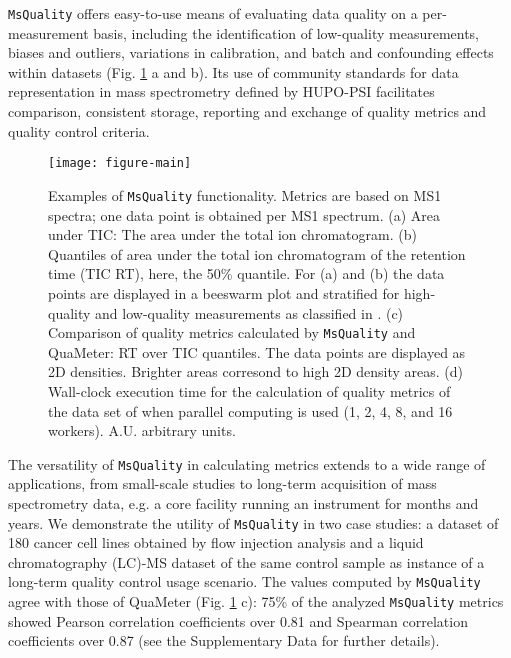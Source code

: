 \documentclass{bioinfo}
\begin{document}
\texttt{MsQuality} offers easy-to-use means of evaluating data quality on a
per-measurement basis, including the identification of low-quality measurements,
biases and outliers, variations in calibration, and batch and confounding effects within
datasets (Fig. \ref{fig:fig1} a and b). Its use of community standards for data
representation in mass spectrometry defined by HUPO-PSI facilitates comparison, 
consistent
storage, reporting and exchange of quality metrics and quality control criteria.

\begin{figure}
    \centering
 	\texttt{[image: figure-main]}
 	  \caption{Examples of \texttt{MsQuality} functionality. Metrics are based
 	        on MS1 spectra; one data point is obtained per MS1 spectrum.
 	        (a) Area under TIC: The area under the total ion chromatogram. 
            (b) Quantiles of area under the total ion
                chromatogram of the retention time (TIC RT), here, the 50\% quantile. 
  	      For (a) and (b) the data points are displayed 
                in a beeswarm plot and stratified for high-quality and low-quality
                measurements as classified in \cite{Amidan2014}.
            (c) Comparison of quality metrics calculated by \texttt{MsQuality} 
                and QuaMeter: RT over TIC quantiles. The
	      data points are displayed as 2D densities. Brighter areas corresond to
               high 2D density areas.
            (d) Wall-clock execution time for the calculation of quality metrics of the 
                data set of \cite{Amidan2014} when parallel computing is used 
                (1, 2, 4, 8, and 16 workers). A.U. arbitrary units.
    } \label{fig:fig1}
\end{figure}

The versatility of \texttt{MsQuality} in calculating metrics extends to a wide range of
applications, from small-scale studies to long-term acquisition of mass spectrometry
data, e.g. a core facility running an instrument for months and years. 
We demonstrate the utility of \texttt{MsQuality} in two case studies: a 
dataset of 180 cancer cell lines obtained by flow injection analysis
\citep{Cherkaoui2022} and a liquid chromatography (LC)-MS dataset of the same 
control sample \citep{Amidan2014} as instance of a long-term quality control 
usage scenario. The values computed by \texttt{MsQuality}
agree with those of QuaMeter \citep{Ma2012} (Fig. \ref{fig:fig1} c): 
75\% of the analyzed \texttt{MsQuality} metrics showed Pearson correlation 
coefficients over 0.81 and Spearman correlation coefficients over 0.87
(see the Supplementary Data for further details).
\end{document}
